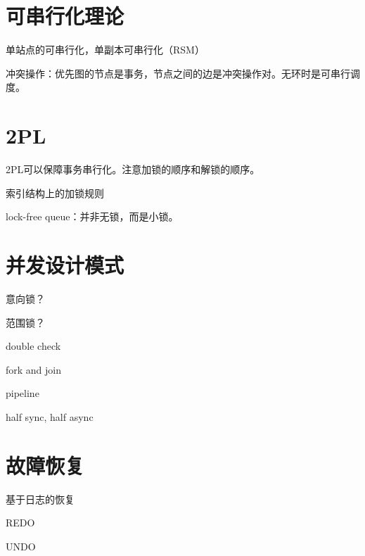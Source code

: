 \section{可串行化理论}

单站点的可串行化，单副本可串行化（RSM）

冲突操作：优先图的节点是事务，节点之间的边是冲突操作对。无环时是可串行调度。

\section{2PL}

2PL可以保障事务串行化。注意加锁的顺序和解锁的顺序。

索引结构上的加锁规则

lock-free queue：并非无锁，而是小锁。

\section{并发设计模式}

意向锁？

范围锁？

\begin{compactitem}
    \item double check
    \item fork and join
    \item pipeline
    \item half sync, half async
\end{compactitem}

\section{故障恢复}

基于日志的恢复

REDO

UNDO
